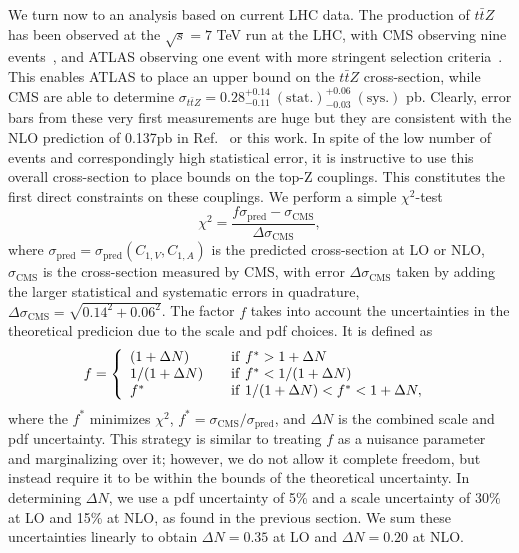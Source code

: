 \documentclass[preprint]{JHEP3} %
\def\ttbZ{t\bar{t}Z}
\begin{document}
We turn now to an analysis based on current LHC data. The production of $\ttbZ$ has been observed at the $\sqrt{s}=7$ TeV run at the LHC, 
with CMS observing nine events~\cite{Chatrchyan:2013qca}, and ATLAS observing one event with more stringent selection criteria~\cite{ATLAS-CONF-2012-126}. 
This enables ATLAS to place an upper bound on the $\ttbZ$ cross-section, 
while CMS are able to determine $\sigma_{\ttbZ} = 0.28^{+0.14}_{-0.11}~\mathrm{(stat.)}^{+0.06}_{-0.03}~ \mathrm{(sys.)}$ pb. 
Clearly, error bars from these very first measurements are huge but they are consistent with the NLO prediction of 0.137pb in Ref.~\cite{Garzelli:2011is} or this work. 
In spite of the low number of events and correspondingly high statistical error, it is instructive to use this overall cross-section to place bounds on the top-Z couplings. 
This constitutes the first direct constraints on these couplings.
We perform a simple $\chi^2$-test 
\begin{equation}
\chi^2 = \frac{f \sigma_{\mathrm{pred}} - \sigma_{\mathrm{CMS}}}{\Delta \sigma_{\mathrm{CMS}}},
\end{equation}
where $\sigma_{\mathrm{pred}}=\sigma_{\mathrm{pred}}(C_{1,V},C_{1,A})$ is the predicted cross-section at LO or NLO, 
$\sigma_{\mathrm{CMS}}$ is the cross-section measured by CMS, with error $\Delta \sigma_{\mathrm{CMS}}$ taken by adding the larger 
statistical and systematic errors in quadrature, $\Delta \sigma_{\mathrm{CMS}}=\sqrt{0.14^2+0.06^2}$. 
The factor $f$ takes into account the uncertainties in the theoretical predicion due to the scale and pdf choices. 
It is defined as~\cite{Baur:2004uw,Baur:2005wi}
 \begin{equation}
f = \left\{ 
\begin{array} {l l}
(1+\Delta N)  & \quad \mathrm{if}~ f^* > 1 + \Delta N \\
1/(1+\Delta N)  & \quad \mathrm{if}~ f^* < 1/(1 + \Delta N) \\
f^* & \quad \mathrm{if}~ 1/(1 + \Delta N) < f^* < 1+\Delta N,
\end{array} \right.\ 
\end{equation}  
where the $f^*$ minimizes $\chi^2$, $f^* = \sigma_{\mathrm{CMS}} / \sigma_{\mathrm{pred}}$, and $\Delta N$ is the combined scale and pdf uncertainty. 
This strategy is similar to treating $f$ as a nuisance parameter and marginalizing over it; however, we do not allow it complete freedom, 
but instead require it to be within the bounds of the theoretical uncertainty. 
In determining $\Delta N$, we use a pdf uncertainty of 5\% and a scale uncertainty of 30\% at LO and 15\% at NLO, as found in the previous section. 
We sum these uncertainties linearly to obtain $\Delta N = 0.35$ at LO and $\Delta N = 0.20$ at NLO. 
\end{document}
